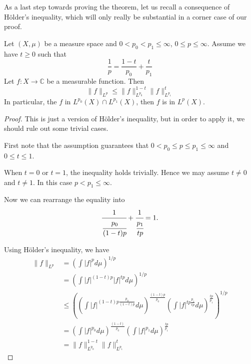 As a last step towards proving the theorem, let us recall a consequence of Hölder's inequality, which will only really be substantial in a corner case of our proof.
\begin{lemma}
  \label{lem:hoelder'}
  \leanok
  Let $(X, \mu)$ be a measure space and $0< p_0 <p_1\leq \infty$, $0 \le p \le \infty$. Assume we have $t \ge 0$ such that
  \[ \frac{1}{p} = \frac{1-t}{p_0} + \frac{t}{p_1} \]
  Let $f : X \to \mathbb C$ be a measurable function. Then
  \[ \| f \|_{L^p} \leq \| f \|^{1-t}_{L^{p_0}} \|f\|^t_{L^{p_1}} \]
  In particular, the $f$ in $L^{p_0}(X) \cap L^{p_1}(X)$, then $f$ is in $L^p(X)$.

  \end{lemma}
    \begin{proof}
    \leanok %

    This is just a version of Hölder's inequality, but in order to apply it, we should rule out some trivial cases.

    First note that the assumption guarantees that $0 < p_0 \le p \le p_1 \le \infty$ and $0\le t \le 1$.

    When $t=0$ or $t=1$, the inequality holds trivially. Hence we may assume $t \ne 0$ and $t \ne 1$. In this case $p < p_1 \le \infty$.

    Now we can rearrange the equality into
    $$ \cfrac{1}{\cfrac{p_0}{(1-t)p}} + \cfrac{1}{\cfrac{p_1}{tp}} = 1.$$

    Using Hölder's inequality, we have
    \begin{align*}
      \|f\|_{L^p} &= (\int |f|^p d\mu)^{1/p} \\
      & = (\int |f|^{(1-t)p} |f|^{tp} d\mu)^{1/p} \\
      & \le ((\int |f|^{(1-t)p \frac{p_0}{(1-t)p}} d\mu)^{\frac{(1-t)p}{p_0}} (\int |f|^{tp \frac{p_1}{tp}} d\mu)^{\frac{tp}{p_1}})^{1/p} \\
      & = (\int |f|^{p_0} d\mu)^{\frac{(1-t)}{p_0}} (\int |f|^{p_1} d\mu)^{\frac{tp}{p_1}} \\
      & = \| f \|^{1-t}_{L^{p_0}} \|f\|^t_{L^{p_1}}
    \end{align*}

  \end{proof}





